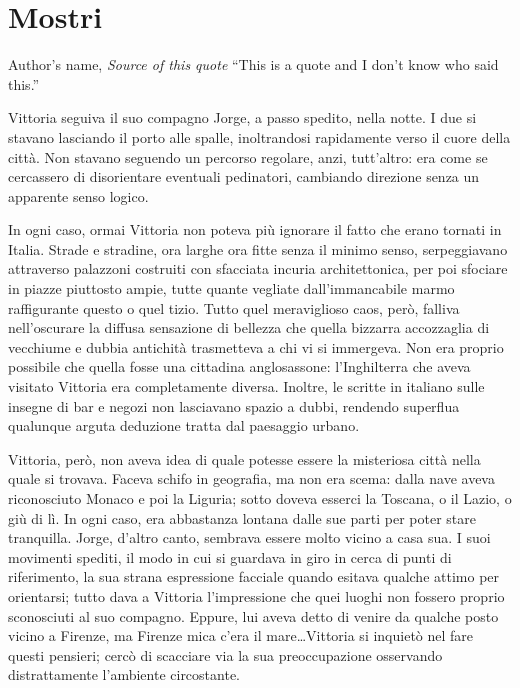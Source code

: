 \chapter{Mostri}

\begin{chapquote}{Author's name, \textit{Source of this quote}}
``This is a quote and I don't know who said this.''
\end{chapquote}


Vittoria seguiva il suo compagno Jorge, a passo spedito, nella notte. I due si stavano lasciando il porto alle spalle, inoltrandosi rapidamente verso il cuore della città. Non stavano seguendo un percorso regolare, anzi, tutt'altro: era come se cercassero di disorientare eventuali pedinatori, cambiando direzione senza un apparente senso logico.

In ogni caso, ormai Vittoria non poteva più ignorare il fatto che erano tornati in Italia. Strade e stradine, ora larghe ora fitte senza il minimo senso, serpeggiavano attraverso palazzoni costruiti con sfacciata incuria architettonica, per poi sfociare in piazze piuttosto ampie, tutte quante vegliate dall'immancabile marmo raffigurante questo o quel tizio. Tutto quel meraviglioso caos, però, falliva nell'oscurare la diffusa sensazione di bellezza che quella bizzarra accozzaglia di vecchiume e dubbia antichità trasmetteva a chi vi si immergeva. Non era proprio possibile che quella fosse una cittadina anglosassone: l'Inghilterra che aveva visitato Vittoria era completamente diversa. Inoltre, le scritte in italiano sulle insegne di bar e negozi non lasciavano spazio a dubbi, rendendo superflua qualunque arguta deduzione tratta dal paesaggio urbano.

Vittoria, però, non aveva idea di quale potesse essere la misteriosa città nella quale si trovava. Faceva schifo in geografia, ma non era scema: dalla nave aveva riconosciuto Monaco e poi la Liguria; sotto doveva esserci la Toscana, o il Lazio, o giù di lì. In ogni caso, era abbastanza lontana dalle sue parti per poter stare tranquilla. Jorge, d'altro canto, sembrava essere molto vicino a casa sua. I suoi movimenti spediti, il modo in cui si guardava in giro in cerca di punti di riferimento, la sua strana espressione facciale quando esitava qualche attimo per orientarsi; tutto dava a Vittoria l'impressione che quei luoghi non fossero proprio sconosciuti al suo compagno. Eppure, lui aveva detto di venire da qualche posto vicino a Firenze, ma Firenze mica c'era il mare\ldots Vittoria si inquietò nel fare questi pensieri; cercò di scacciare via la sua preoccupazione osservando distrattamente l'ambiente circostante.


